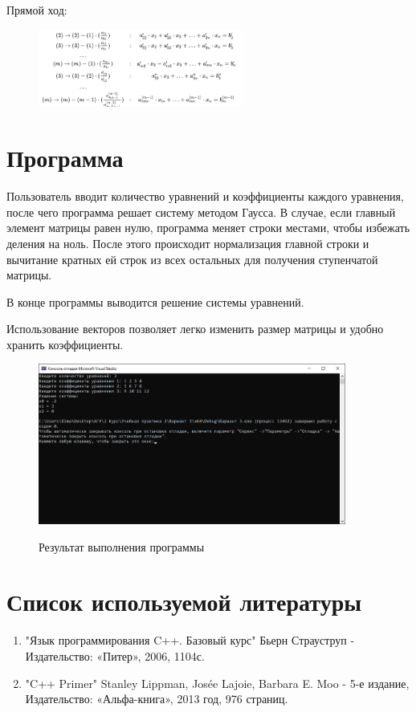 \documentclass[14pt,a4paper]{scrartcl}
\begin{document}
Прямой ход:

\begin{figure}[h!]
    \centering
    \includegraphics [width=0.6\textwidth]{formula2}\\
    
    \label{fig:pic2}
\end{figure}

\newpage


\section{Программа}


Пользователь вводит количество уравнений и коэффициенты каждого уравнения, после чего программа решает систему методом Гаусса. В случае, если главный элемент матрицы равен нулю, программа меняет строки местами, чтобы избежать деления на ноль. После этого происходит нормализация главной строки и вычитание кратных ей строк из всех остальных для получения ступенчатой матрицы.

В конце программы выводится решение системы уравнений.

Использование векторов позволяет легко изменить размер матрицы и удобно хранить коэффициенты.
\begin{figure}[h!]
    \centering
    \includegraphics [width=0.9\textwidth]{Result}\\
    \caption{Результат выполнения программы}
    \label{fig:picResult}
\end{figure}

\newpage \section{Список используемой литературы}

\begin{enumerate}

    \item "Язык программирования C++. Базовый курс" Бьерн Страуструп - Издательство: «Питер», 2006, 1104с.
    \item "C++ Primer" Stanley Lippman, Josée Lajoie, Barbara E. Moo - 5-е издание, Издательство: «Альфа-книга», 2013 год, 976 страниц.
\end{enumerate}
\end{document}
